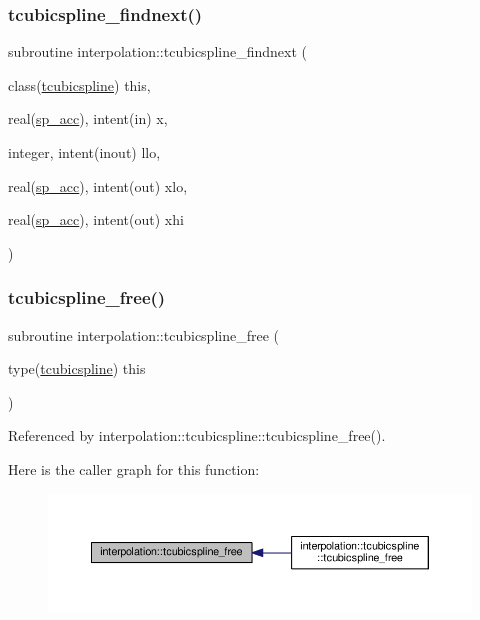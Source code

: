 \subsubsection{\texorpdfstring{tcubicspline\+\_\+findnext()}{tcubicspline\_findnext()}}
{\footnotesize\ttfamily subroutine interpolation\+::tcubicspline\+\_\+findnext (\begin{DoxyParamCaption}\item[{class(\mbox{\hyperlink{structinterpolation_1_1tcubicspline}{tcubicspline}})}]{this,  }\item[{real(\mbox{\hyperlink{namespaceinterpolation_af72aa9a05feb8ef90b2d26e4a013abf3}{sp\+\_\+acc}}), intent(in)}]{x,  }\item[{integer, intent(inout)}]{llo,  }\item[{real(\mbox{\hyperlink{namespaceinterpolation_af72aa9a05feb8ef90b2d26e4a013abf3}{sp\+\_\+acc}}), intent(out)}]{xlo,  }\item[{real(\mbox{\hyperlink{namespaceinterpolation_af72aa9a05feb8ef90b2d26e4a013abf3}{sp\+\_\+acc}}), intent(out)}]{xhi }\end{DoxyParamCaption})}

\mbox{\label{namespaceinterpolation_a953dc25c7196a60416148edc8944b39e}} 
\subsubsection{\texorpdfstring{tcubicspline\+\_\+free()}{tcubicspline\_free()}}
{\footnotesize\ttfamily subroutine interpolation\+::tcubicspline\+\_\+free (\begin{DoxyParamCaption}\item[{type(\mbox{\hyperlink{structinterpolation_1_1tcubicspline}{tcubicspline}})}]{this }\end{DoxyParamCaption})}



Referenced by interpolation\+::tcubicspline\+::tcubicspline\+\_\+free().

Here is the caller graph for this function\+:
\nopagebreak
\begin{figure}[H]
\begin{center}
\leavevmode
\includegraphics[width=350pt]{namespaceinterpolation_a953dc25c7196a60416148edc8944b39e_icgraph}
\end{center}
\end{figure}
\mbox{\label{namespaceinterpolation_a36b9a543d32de4944ae9289358f15a5a}} 
